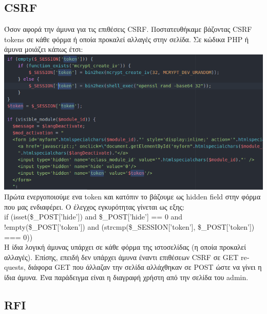\documentclass{article}
\begin{document}
\subsection*{\textlatin{CSRF}}
Όσον αφορά την άμυνα για τις επιθέσεις \textlatin{CSRF}. Ποστατευθήκαμε βάζοντας \textlatin{CSRF tokens} 
σε κάθε φόρμα ή οποία προκαλεί αλλαγές στην σελίδα. Σε κώδικα \textlatin{PHP} ή άμυνα μοιάζει κάπως 
έτσι:\\
\includegraphics[scale=0.5]{csrf}\\
Πρώτα ενεργοποιούμε ενα \textlatin{token} και κατόπιν το βάζουμε ως \textlatin{hidden field} στην 
φόρμα που μας ενδιαφέρει. Ο έλεγχος εγκυρότητας γίνεται ως εξης:\\
\textlatin{if (isset(\$\_POST['hide']) and \$\_POST['hide'] == 0 and !empty(\$\_POST['token']) and (strcmp(\$\_SESSION['token'], \$\_POST['token']) === 0))}\\
Η ίδια λογική άμυνας υπάρχει σε κάθε φόρμα της ιστοσελίδας (η οποία προκαλεί αλλαγές).
Επίσης, επειδή δεν υπάρχει άμυνα έναντι επιθέσεων \textlatin{CSRF} σε \textlatin{GET requests}, διάφορα 
\textlatin{GET} που άλλαζαν την σελίδα αλλάχθηκαν σε \textlatin{POST} ώστε να γίνει η ίδια άμυνα. 
Ένα παράδειγμα είναι η διαγραφή χρήστη από την σελίδα του \textlatin{admin}.

\subsection*{\textlatin{RFI}}
 
\end{document}
